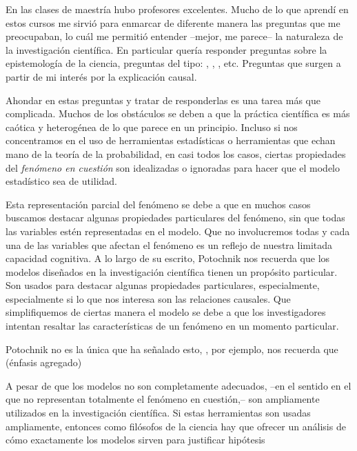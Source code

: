 En las clases de maestría hubo profesores excelentes.
Mucho de lo que aprendí en estos cursos me sirvió para enmarcar de diferente manera las preguntas que me preocupaban, lo cuál me permitió entender --mejor, me parece-- la naturaleza de la investigación científica. 
En particular quería responder preguntas sobre la epistemología de la ciencia, preguntas del tipo: , , , etc. 
Preguntas que surgen a partir de mi interés por la explicación causal.

Ahondar en estas preguntas y tratar de responderlas es una tarea más que complicada. 
Muchos de los obstáculos se deben a que la práctica científica es más caótica y heterogénea de lo que parece en un principio. 
Incluso si nos concentramos en el uso de herramientas estadísticas o herramientas que echan mano de la teoría de la probabilidad, en casi todos los casos, ciertas propiedades del \emph{fenómeno en cuestión} son idealizadas o ignoradas para hacer que el modelo estadístico sea de utilidad.

Esta representación parcial del fenómeno se debe a que en muchos casos buscamos destacar algunas propiedades particulares del fenómeno, sin que todas las variables estén representadas en el modelo.
Que no involucremos todas y cada una de las variables que afectan el fenómeno es un reflejo de nuestra limitada capacidad cognitiva.
A lo largo de su escrito, Potochnik nos recuerda que los modelos diseñados en la investigación científica tienen un propósito particular. 
Son usados para destacar algunas propiedades particulares, especialmente, especialmente si lo que nos interesa son las relaciones causales. 
Que simplifiquemos de ciertas manera el modelo se debe a que los investigadores intentan resaltar las características de un fenómeno en un momento particular.

Potochnik no es la única que ha señalado esto,
\textcite[][p.24]{abrams2023evolution}, por ejemplo, nos recuerda que  (énfasis agregado) 

A pesar de que los modelos no son completamente adecuados, --en el sentido en el que no representan totalmente el fenómeno en cuestión,-- son ampliamente utilizados en la investigación científica. 
Si estas herramientas son usadas ampliamente, entonces como filósofos de la ciencia hay que ofrecer un análisis de cómo exactamente los modelos sirven para justificar hipótesis 

